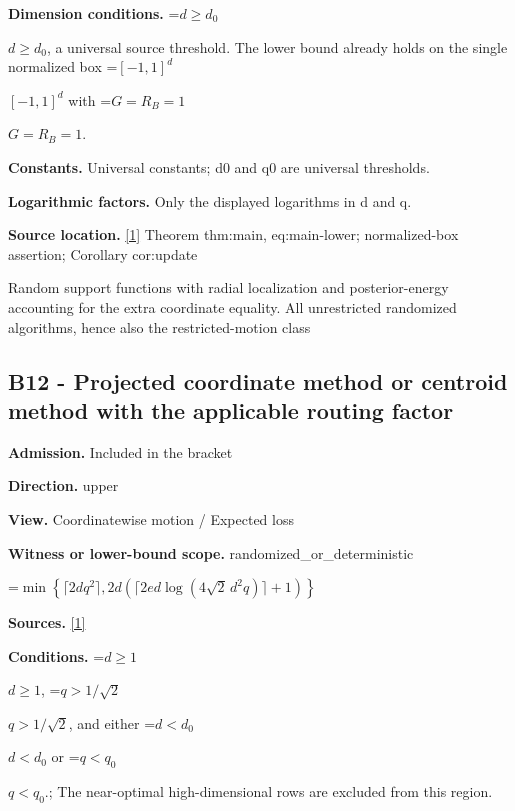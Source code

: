 \documentclass[10pt,a4paper]{article}
\newcommand{\AtlasMath}[1]{\par\begingroup\centering\setbox0=\hbox{$\displaystyle #1$}\ifdim\wd0>1.4\linewidth\typeout{ATLAS WIDE FORMULA: \the\wd0}\fi\ifdim\wd0>\linewidth\resizebox{\linewidth}{!}{\box0}\else\box0\fi\par\endgroup}
\newcommand{\AtlasInlineMath}[1]{\begingroup\setbox0=\hbox{$#1$}\ifdim\wd0>.4\linewidth\endgroup\AtlasMath{#1}\else\endgroup$#1$\fi}
\begin{document}
\textbf{Dimension conditions.} \AtlasInlineMath{d\ge d_0}, a universal source threshold. The lower bound already holds on the single normalized box \AtlasInlineMath{[-1,1]^d} with \AtlasInlineMath{G=R_B=1}.



\textbf{Constants.} Universal constants; d0 and q0 are universal thresholds.



\textbf{Logarithmic factors.} Only the displayed logarithms in d and q.



\textbf{Source location.} \href{https://github.com/WU-Wendao/Colombo/blob/main/colombo_sensorium/Complexity_altas/data/sources/colombo/U03/manuscript.pdf}{[1]} Theorem thm:main, eq:main-lower; normalized-box assertion; Corollary cor:update



Random support functions with radial localization and posterior-energy accounting for the extra coordinate equality. All unrestricted randomized algorithms, hence also the restricted-motion class



\subsection{B12 - Projected coordinate method or centroid method with the applicable routing factor}


\textbf{Admission.} Included in the bracket



\textbf{Direction.} upper



\textbf{View.} Coordinatewise motion / Expected loss



\textbf{Witness or lower-bound scope.} randomized\_or\_deterministic



\AtlasMath{\min\left\{\lceil2dq^2\rceil,2d\left(\lceil2ed\log(4\sqrt2\,d^2q)\rceil+1\right)\right\}}


\textbf{Sources.} \href{https://github.com/WU-Wendao/Colombo/blob/main/colombo_sensorium/Complexity_altas/data/sources/colombo/U03/manuscript.pdf}{[1]}



\textbf{Conditions.} \AtlasInlineMath{d\ge1}, \AtlasInlineMath{q>1/\sqrt2}, and either \AtlasInlineMath{d<d_0} or \AtlasInlineMath{q<q_0}.; The near-optimal high-dimensional rows are excluded from this region.
\end{document}
